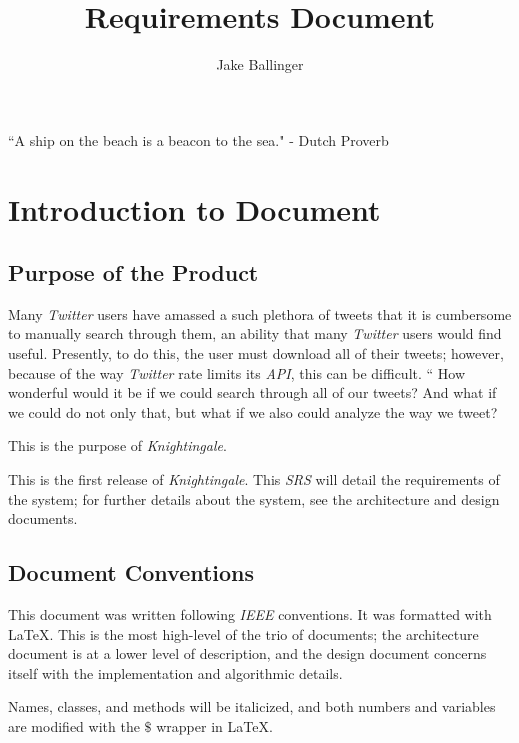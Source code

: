 \documentclass[a4paper, 12pt]{article}
\title{Requirements Document}
\author{Jake Ballinger}
\begin{document}
\maketitle

\begin{center}
\centering ``A ship on the beach is a beacon to the sea." \newline
\centering - Dutch Proverb
\end{center}

\section{Introduction to Document} \label{sec:intro}
\subsection{Purpose of the Product} \label{sec:purpose}
\begin{adjustwidth}{2em}{0pt}
Many \textit{Twitter} users have amassed a such plethora of tweets that it is cumbersome to manually search through them, an ability that many \textit{Twitter} users would find useful. Presently, to do this, the user must download all of their tweets; however, because of the way \textit{Twitter} rate limits its \textit{API}, this can be difficult. \newline
``
\noindent How wonderful would it be if we could search through all of our tweets? And what if we could do not only that, but what if we also could analyze the way we tweet?\newline

\noindent This is the purpose of \textit{Knightingale}. \newline

\noindent This is the first release of \textit{Knightingale}. This \textit{SRS} will detail the requirements of the system; for further details about the system, see the architecture and design documents.
\end{adjustwidth}

\subsection{Document Conventions} \label{sec:conventions}
\begin{adjustwidth}{2em}{0pt}
This document was written following \textit{IEEE} conventions. It was formatted with \LaTeX. This is the most high-level of the trio of documents; the architecture document is at a lower level of description, and the design document concerns itself with the implementation and algorithmic details. \newline

\noindent Names, classes, and methods will be italicized, and both numbers and variables are modified with the $\$$ wrapper in \LaTeX.
\end{adjustwidth}
\end{document}
